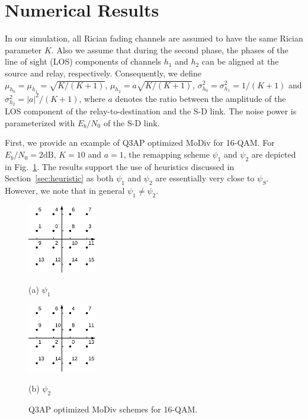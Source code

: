 \documentclass[journal]{IEEEtran}
\begin{document}
\section{Numerical Results}
\label{sec:simulation}
In our simulation, all Rician fading channels are assumed to have the same
Rician parameter $K$. Also we assume that during the second phase, the phases of the
line of sight (LOS) components of channels $h_1$ and $h_2$ can be aligned at the
source and relay, respectively.
Consequently, we define $\mu_{h_0} = \mu_{h_1} = \sqrt{K/(K + 1)}$,
$\mu_{h_2}=a\sqrt{K/(K + 1)}$,  $\sigma_{h_0}^2 = \sigma_{h_1}^2 = 1/(K+1)$ and
$\sigma_{h_2}^2 = |a|^2/(K+1)$, where $a$ denotes the ratio
between the amplitude of the LOS component of the
relay-to-destination and the S-D link. The noise power is
parameterized with $E_b/N_0$ of the S-D link.

First, we provide an example of Q3AP optimized MoDiv for 16-QAM. For $E_b/N_0 =
2\mbox{dB}$, $K = 10$ and $a = 1$, the remapping scheme $\psi_1$ and $\psi_2$
are depicted in Fig.~\ref{fig:example}. The results support the use of heuristics discussed in
Section~\ref{sec:heuristic} as both $\psi_1$ and $\psi_2$ are essentially very
close to $\psi_S$. However, we note that in general $\psi_1\not=\psi_2$.

\begin{figure}[!t]
    \begin{minipage}[b]{0.48\linewidth}
      \centering
      \centerline{\includegraphics[width=3.0cm]{./figs/psi1.eps}}
      \centerline{(a) $\psi_1$}\medskip
    \end{minipage}
    \hfill
    \begin{minipage}[b]{.48\linewidth}
      \centering
      \centerline{\includegraphics[width=3.0cm]{./figs/psi2.eps}}
      \centerline{(b) $\psi_2$}\medskip
    \end{minipage}
    \caption{Q3AP optimized MoDiv schemes for 16-QAM.}
    \label{fig:example}
\end{figure}
\end{document}
